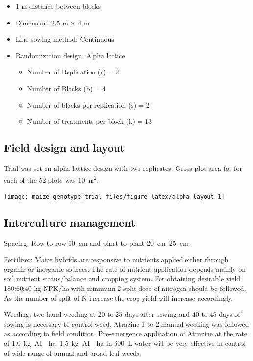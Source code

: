 \documentclass[
]{article}
\providecommand{\tightlist}{%
  \setlength{\itemsep}{0pt}\setlength{\parskip}{0pt}}
\begin{document}
\begin{itemize}
\tightlist
\item
  1 m distance between blocks
\item
  Dimension: 2.5 m × 4 m
\item
  Line sowing method: Continuous
\item
  Randomization design: Alpha lattice

  \begin{itemize}
  \tightlist
  \item
    Number of Replication (r) = 2
  \item
    Number of Blocks (b) = 4
  \item
    Number of blocks per replication (s) = 2
  \item
    Number of treatments per block (k) = 13
  \end{itemize}
\end{itemize}

\hypertarget{field-design-and-layout}{%
\subsection{Field design and layout}\label{field-design-and-layout}}

Trial was set on alpha lattice design with two replicates. Gross plot area for for each of the 52 plots was \SI{10}{\metre\squared}.

\begin{center}\texttt{[image: maize\_genotype\_trial\_files/figure-latex/alpha-layout-1]} \end{center}

\hypertarget{interculture-management}{%
\subsection{Interculture management}\label{interculture-management}}

Spacing: Row to row \SI{60}{\centi\metre} and plant to plant \SIrange{20}{25}{\centi\metre}.

Fertilizer: Maize hybrids are responsive to nutrients applied either through organic or inorganic sources. The rate of nutrient application depends mainly on soil nutrient status/balance and cropping system. For obtaining desirable yield 180:60:40 kg NPK/ha with minimum 2 split dose of nitrogen should be followed. As the number of split of N increase the crop yield will increase accordingly.

Weeding: two hand weeding at 20 to 25 days after sowing and 40 to 45 days of sowing is necessary to control weed. Atrazine 1 to 2 manual weeding was followed as according to field condition. Pre-emergence application of Atrazine at the rate of \SIrange{1.0}{1.5}{\kg AI \per\hectare} in \SI{600}{\liter} water will be very effective in control of wide range of annual and broad leaf weeds.
\end{document}
